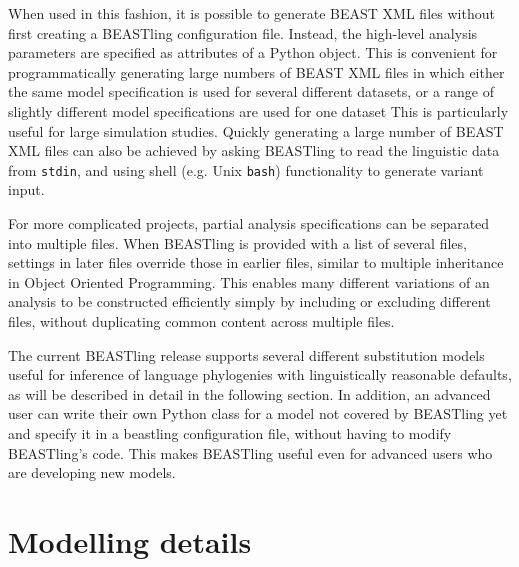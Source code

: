 \documentclass[10pt,a4paper]{article}
\begin{document}
When used in this fashion, it is possible to generate BEAST XML files without first creating a BEASTling configuration file.  Instead, the high-level analysis parameters are specified as attributes of a Python object.  This is convenient for programmatically generating large numbers of BEAST XML files in which either the same model specification is used for several different datasets, or a range of slightly different model specifications are used for one dataset  This is particularly useful for large simulation studies. Quickly generating a large number of BEAST XML files can also be achieved by asking BEASTling to read the linguistic data from \texttt{stdin}, and using shell (e.g. Unix \texttt{bash}) functionality to generate variant input.

For more complicated projects, partial analysis specifications can be separated into multiple files.  When BEASTling is provided with a list of several files, settings in later files override those in earlier files, similar to multiple inheritance in Object Oriented Programming.  This enables many different variations of an analysis to be constructed efficiently simply by including or excluding different files, without duplicating common content across multiple files.

The current BEASTling release supports several different substitution models useful for inference of language phylogenies with linguistically reasonable defaults, as will be described in detail in the following section. In addition, an advanced user can write their own Python class for a model not covered by BEASTling yet and specify it in a beastling configuration file, without having to modify BEASTling's code.  This makes BEASTling useful even for advanced users who are developing new models.

\section{Modelling details}
\end{document}
